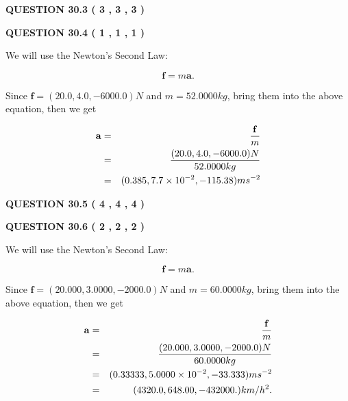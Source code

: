\documentclass[12pt]{article}
\begin{document}
\vspace{0.2in}
  
{\textbf{\Large{QUESTION
30.3 
 (           3 ,           3 ,           3 )
}}}
  
  
  
\vspace{0.2in}
  
{\textbf{\Large{QUESTION
30.4 
 (           1 ,           1 ,           1 )
}}}
  
  


 
 

We will use the Newton's Second Law:
 
\[
\mathbf{f}=m\mathbf{a}.
\]
 
Since $\mathbf{f}= %
(20.0 , 4.0 , -6000.0) N$
and $m= %
52.0000kg$, bring them into the above equation, then we get
 
\begin{eqnarray*}
\mathbf{a}&=&\frac{\mathbf{f}}m  \\
&=&\frac{ %
(20.0 , 4.0 , -6000.0) N}{ %
52.0000kg}  \\
&=& %
(0.385 , 7.7 \times 10^{-2} , -115.38) ms^{-2}
\end{eqnarray*}
 
 
 
  
\vspace{0.2in}
  
{\textbf{\Large{QUESTION
30.5 
 (           4 ,           4 ,           4 )
}}}
  
  
  
\vspace{0.2in}
  
{\textbf{\Large{QUESTION
30.6 
 (           2 ,           2 ,           2 )
}}}
  
  
 
 

We will use the Newton's Second Law:
 
\[
\mathbf{f}=m\mathbf{a}.
\]
 
Since $\mathbf{f}=( %
20.000,  %
3.0000,  %
-2000.0 )N$
and $m= %
60.0000kg$, bring them into the above equation, then we get
 
\begin{eqnarray*}
\mathbf{a}&=&\frac{\mathbf{f}}m  \\
&=&\frac{(
20.000 ,
3.0000 ,
-2000.0 )N
}{ %
60.0000 kg}  \\
&=&(
0.33333 ,
5.0000 \times 10^{-2},
-33.333
)ms^{-2} \\
&=&(
4320.0 ,
648.00 ,
-432000.
)km/h^2.
\end{eqnarray*}
 
\end{document}
